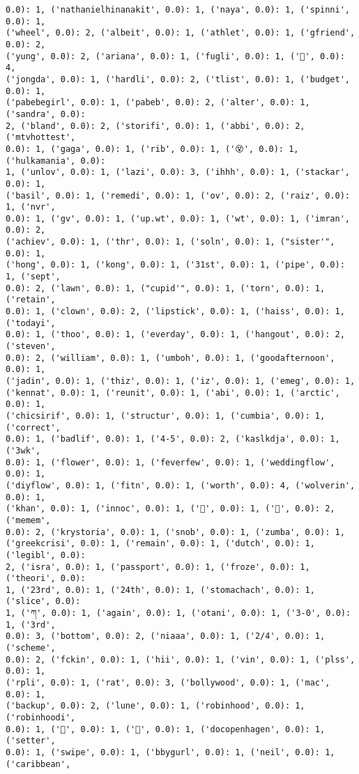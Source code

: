 \documentclass[11pt]{article}
\begin{document}
\begin{Verbatim}[commandchars=\\\{\}]
0.0): 1, ('nathanielhinanakit', 0.0): 1, ('naya', 0.0): 1, ('spinni', 0.0): 1,
('wheel', 0.0): 2, ('albeit', 0.0): 1, ('athlet', 0.0): 1, ('gfriend', 0.0): 2,
('yung', 0.0): 2, ('ariana', 0.0): 1, ('fugli', 0.0): 1, ('💞', 0.0): 4,
('jongda', 0.0): 1, ('hardli', 0.0): 2, ('tlist', 0.0): 1, ('budget', 0.0): 1,
('pabebegirl', 0.0): 1, ('pabeb', 0.0): 2, ('alter', 0.0): 1, ('sandra', 0.0):
2, ('bland', 0.0): 2, ('storifi', 0.0): 1, ('abbi', 0.0): 2, ('mtvhottest',
0.0): 1, ('gaga', 0.0): 1, ('rib', 0.0): 1, ('😵', 0.0): 1, ('hulkamania', 0.0):
1, ('unlov', 0.0): 1, ('lazi', 0.0): 3, ('ihhh', 0.0): 1, ('stackar', 0.0): 1,
('basil', 0.0): 1, ('remedi', 0.0): 1, ('ov', 0.0): 2, ('raiz', 0.0): 1, ('nvr',
0.0): 1, ('gv', 0.0): 1, ('up.wt', 0.0): 1, ('wt', 0.0): 1, ('imran', 0.0): 2,
('achiev', 0.0): 1, ('thr', 0.0): 1, ('soln', 0.0): 1, ("sister'", 0.0): 1,
('hong', 0.0): 1, ('kong', 0.0): 1, ('31st', 0.0): 1, ('pipe', 0.0): 1, ('sept',
0.0): 2, ('lawn', 0.0): 1, ("cupid'", 0.0): 1, ('torn', 0.0): 1, ('retain',
0.0): 1, ('clown', 0.0): 2, ('lipstick', 0.0): 1, ('haiss', 0.0): 1, ('todayi',
0.0): 1, ('thoo', 0.0): 1, ('everday', 0.0): 1, ('hangout', 0.0): 2, ('steven',
0.0): 2, ('william', 0.0): 1, ('umboh', 0.0): 1, ('goodafternoon', 0.0): 1,
('jadin', 0.0): 1, ('thiz', 0.0): 1, ('iz', 0.0): 1, ('emeg', 0.0): 1,
('kennat', 0.0): 1, ('reunit', 0.0): 1, ('abi', 0.0): 1, ('arctic', 0.0): 1,
('chicsirif', 0.0): 1, ('structur', 0.0): 1, ('cumbia', 0.0): 1, ('correct',
0.0): 1, ('badlif', 0.0): 1, ('4-5', 0.0): 2, ('kaslkdja', 0.0): 1, ('3wk',
0.0): 1, ('flower', 0.0): 1, ('feverfew', 0.0): 1, ('weddingflow', 0.0): 1,
('diyflow', 0.0): 1, ('fitn', 0.0): 1, ('worth', 0.0): 4, ('wolverin', 0.0): 1,
('khan', 0.0): 1, ('innoc', 0.0): 1, ('🙏', 0.0): 1, ('🎂', 0.0): 2, ('memem',
0.0): 2, ('krystoria', 0.0): 1, ('snob', 0.0): 1, ('zumba', 0.0): 1,
('greekcrisi', 0.0): 1, ('remain', 0.0): 1, ('dutch', 0.0): 1, ('legibl', 0.0):
2, ('isra', 0.0): 1, ('passport', 0.0): 1, ('froze', 0.0): 1, ('theori', 0.0):
1, ('23rd', 0.0): 1, ('24th', 0.0): 1, ('stomachach', 0.0): 1, ('slice', 0.0):
1, ('ཀ', 0.0): 1, ('again', 0.0): 1, ('otani', 0.0): 1, ('3-0', 0.0): 1, ('3rd',
0.0): 3, ('bottom', 0.0): 2, ('niaaa', 0.0): 1, ('2/4', 0.0): 1, ('scheme',
0.0): 2, ('fckin', 0.0): 1, ('hii', 0.0): 1, ('vin', 0.0): 1, ('plss', 0.0): 1,
('rpli', 0.0): 1, ('rat', 0.0): 3, ('bollywood', 0.0): 1, ('mac', 0.0): 1,
('backup', 0.0): 2, ('lune', 0.0): 1, ('robinhood', 0.0): 1, ('robinhoodi',
0.0): 1, ('🚙', 0.0): 1, ('💚', 0.0): 1, ('docopenhagen', 0.0): 1, ('setter',
0.0): 1, ('swipe', 0.0): 1, ('bbygurl', 0.0): 1, ('neil', 0.0): 1, ('caribbean',

\end{Verbatim}
\end{document}
